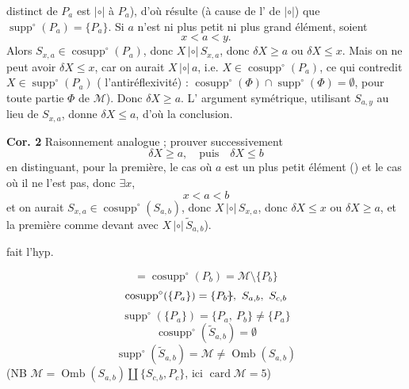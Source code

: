 \documentclass[11pt,a4paper]{article}
\begin{document}
distinct de $P_a$ est $|{\circ}|$ à $P_a$), d'où résulte  (à cause de l' de $|{\circ}|$) que $\operatorname{supp}^\circ(P_a)=\{P_a\}$. Si $a$ n'est ni plus petit ni plus grand élément, soient 
\[ x<a<y . \]
Alors \struck{$\xi$} $S_{x,a}\in\operatorname{cosupp}^\circ(P_a)$, donc $X\,|{\circ}|\,S_{x,a}$, donc $\delta X\geq a$ ou $\delta X\leq x$. Mais on ne peut avoir $\delta X\leq x$, car on aurait $X\,|{\circ}|\,a$, i.e. $X\in\operatorname{cosupp}^\circ(P_a)$, ce qui contredit $X\in\operatorname{supp}^\circ(P_a)$ ( l'antiréflexivité) : $\operatorname{cosupp}^\circ(\Phi)\cap\operatorname{supp}^\circ(\Phi)=\emptyset$, pour toute partie $\Phi$ de $\mathcal{M}$). Donc $\delta X\geq a$. L'\struck{\ill{}} argument symétrique, utilisant $S_{a,y}$ au lieu de $S_{x,a}$, donne $\delta X\leq a$, d'où la conclusion.

\textbf{Cor. 2} Raisonnement analogue ;   prouver successivement
\[ \delta X\geq a, \quad\text{puis}\quad \delta X\leq b \]
en distinguant, pour la première, le cas où $a$ est un plus petit élément () et le cas où il ne l'est pas, donc $\exists x$,
\[ x<a<b \]
et on aurait $S_{x,a}\in\operatorname{cosupp}^\circ(S_{a,b})$, donc $X\,|{\circ}|\,S_{x,a}$, donc $\delta X\leq x$ ou $\delta X\geq a$, et la première \ill{}  comme \ill{} devant \ill{} avec $X\,|{\circ}|\,\widetilde{S}_{a,b}$).

 fait  l'hyp. 


\ill{} \[ = \operatorname{cosupp}^\circ(P_b) = \mathcal{M}\setminus\{P_b\} \]
\[ \operatorname{cosupp}^\circ(\{P_a\}) = \{P_b\text{\struck{$\}$}},\ S_{a,b},\ S_{c,b} \]
\[ \operatorname{supp}^\circ(\{P_a\}) = \{P_a,\ P_b\} \neq \{P_a\} \]
\[ \operatorname{cosupp}^\circ(\widetilde{S}_{a,b}) = \emptyset \]
\[ \operatorname{supp}^\circ(\widetilde{S}_{a,b}) = \mathcal{M} \neq \operatorname{Omb}(S_{a,b}) \]
(NB $\mathcal{M}=\operatorname{Omb}(S_{a,b})\amalg\{S_{c,b},P_c\}$, ici $\operatorname{card}\mathcal{M}=5$)
\end{document}
